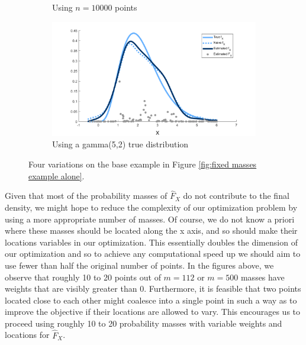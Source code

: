 \begin{figure}
\begin{subfigure}[b]{0.49\textwidth}
		\caption{Using $n = 10000$ points}
		\label{fig:fixed masses example n10000}
	\end{subfigure}
	\hfill
	\begin{subfigure}[b]{0.49\textwidth}
		\centering
		\includegraphics[width = \textwidth]{Figures/Deconvolution/fixed_masses_example_Xgamma.png}
		\caption{Using a gamma(5,2) true distribution}
		\label{fig:fixed masses example Xgamma}
	\end{subfigure}
	\caption{Four variations on the base example in Figure \ref{fig:fixed masses example alone}.}
	\label{fig:comparison different fixed masses examples}
\end{figure}

Given that most of the probability masses of $\hat{F}_X$ do not contribute to the final density, we might hope to reduce the complexity of our optimization problem by using a more appropriate number of masses. Of course, we do not know a priori where these masses should be located along the x axis, and so should make their locations variables in our optimization. This essentially doubles the dimension of our optimization and so to achieve any computational speed up we should aim to use fewer than half the original number of points. In the figures above, we observe that roughly 10 to 20 points out of $m = 112$ or $m = 500$ masses have weights that are visibly greater than 0. Furthermore, it is feasible that two points located close to each other might coalesce into a single point in such a way as to improve the objective if their locations are allowed to vary. This encourages us to proceed using roughly 10 to 20 probability masses with variable weights and locations for $\hat{F}_X$.

